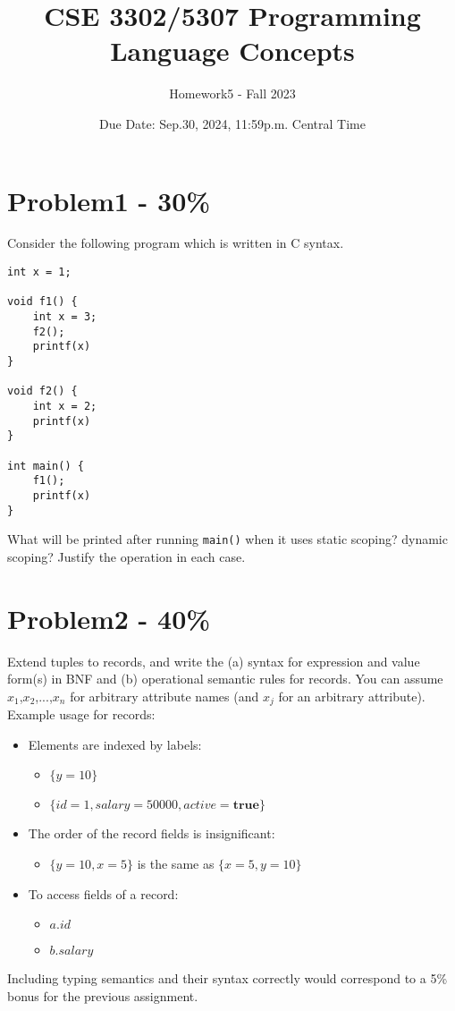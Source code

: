 \documentclass{article}
\newcommand{\answerboxbig}{
    \vspace{20cm} %
}
\begin{document}
\title{CSE 3302/5307 Programming Language Concepts}
\author{Homework5 - Fall 2023}
\date{Due Date: Sep.30, 2024, 11:59p.m. Central Time}
\maketitle
\thispagestyle{fancy}


\section*{Problem1 - 30\%}

Consider the following program which is written in C syntax.
\begin{lstlisting}
int x = 1;

void f1() {
    int x = 3;
    f2();
    printf(x)
}

void f2() {
    int x = 2;
    printf(x)
}

int main() {
    f1();
    printf(x)
}
\end{lstlisting}
What will be printed after running \texttt{main()} when it uses static scoping?
    dynamic scoping? Justify the operation in each case.
\answerboxbig

\section*{Problem2 - 40\%}

Extend tuples to records, and write the (a) syntax for expression and value form(s) in BNF and (b) operational semantic rules for records. You can assume $x_1$,$x_2$,...,$x_n$ for arbitrary attribute names (and $x_j$ for an arbitrary attribute).
Example usage for records:
\begin{itemize}
    \item Elements are indexed by labels:
    \begin{itemize}
        \item $\{y=10\}$
        \item $\{id=1,salary=50000,active=\mathbf{true}\}$
    \end{itemize}
    \item The order of the record fields is insignificant:
    \begin{itemize}
        \item $\{y=10,x=5\}$ is the same as $\{x=5,y=10\}$
    \end{itemize}
    \item To access fields of a record:
    \begin{itemize}
        \item $a.id$
        \item $b.salary$
    \end{itemize}
\end{itemize}
Including typing semantics and their syntax correctly would correspond to a 5\% bonus for the previous assignment.
\answerboxbig
\end{document}
